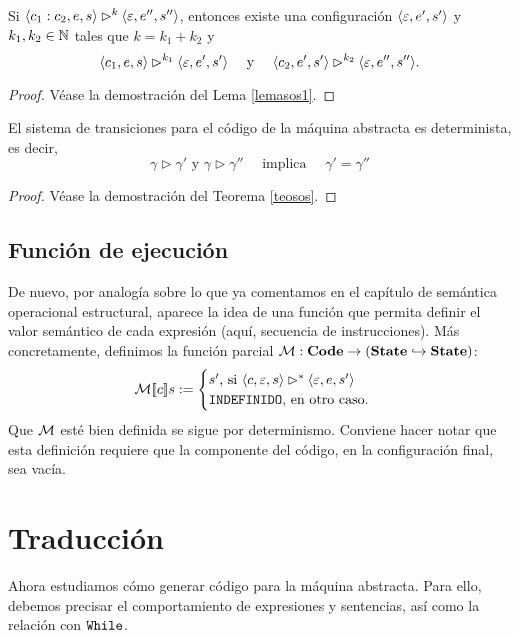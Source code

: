 \begin{lema}
Si $\langle c_1:c_2, e, s \rangle \rhd^k \langle \varepsilon, e'', s'' \rangle$, entonces existe una configuración $\langle \varepsilon, e', s' \rangle$ y $k_1, k_2 \in \mathbb{N}$ tales que $k = k_1 + k_2$ y 
$$\langle c_1, e, s \rangle \rhd^{k_1} \langle \varepsilon, e', s' \rangle \quad\text{ y }\quad \langle c_2, e', s' \rangle \rhd^{k_2} \langle \varepsilon, e'', s'' \rangle.$$
\end{lema}
\begin{proof}
Véase la demostración del Lema \ref{lemasos1}.
\end{proof}

\begin{theorem}
El sistema de transiciones para el código de la máquina abstracta es determinista, es decir, 
$$\gamma \rhd \gamma'  \text{ y }\gamma \rhd \gamma'' \quad \text{ implica } \quad \gamma' = \gamma''$$
\end{theorem}
\begin{proof}
Véase la demostración del Teorema \ref{teosos}.
\end{proof}

\subsection{Función de ejecución}

De nuevo, por analogía sobre lo que ya comentamos en el capítulo de semántica operacional estructural, aparece la idea de una función que  permita definir el valor semántico de cada expresión (aquí, secuencia de instrucciones). Más concretamente, definimos la función parcial $\mathcal{M}: \mathbf{Code} \rightarrow (\mathbf{State} \hookrightarrow \mathbf{State})$:
$$\mathcal{M}[\![c]\!]s := \begin{cases}s' \text{, si } \langle c, \varepsilon, s \rangle\rhd^* \langle \varepsilon, e, s' \rangle\\ \texttt{INDEFINIDO} \text{, en otro caso.}\end{cases}$$
Que $\mathcal{M}$ esté bien definida se sigue por determinismo. Conviene hacer notar que esta definición requiere que la componente del código, en la configuración final, sea vacía.

\section{Traducción}

Ahora estudiamos cómo generar código para la máquina abstracta. Para ello, debemos precisar el comportamiento de expresiones y sentencias, así como la relación con $\texttt{While}$.

